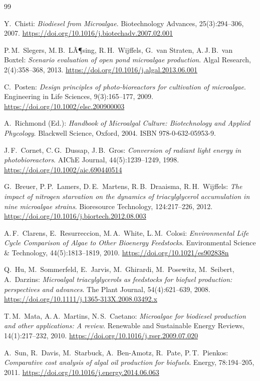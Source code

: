 ﻿\documentclass[a4paper,12pt]{article}
\theoremstyle{definition}
\begin{document}
\begin{thebibliography}{99}

Y.~Chisti:
\textit{Biodiesel from Microalgae}.
Biotechnology Advances, 25(3):294--306, 2007.
\url{https://doi.org/10.1016/j.biotechadv.2007.02.001}

P.\,M.~Slegers, M.\,B.~LÃ¶sing, R.\,H.~Wijffels, G.~van Straten, A.\,J.\,B.~van Boxtel:
\textit{Scenario evaluation of open pond microalgae production}.
Algal Research, 2(4):358--368, 2013.
\url{https://doi.org/10.1016/j.algal.2013.06.001}

C.~Posten:
\textit{Design principles of photo-bioreactors for cultivation of microalgae}.
Engineering in Life Sciences, 9(3):165--177, 2009.
\url{https://doi.org/10.1002/elsc.200900003}

A.~Richmond (Ed.):
\textit{Handbook of Microalgal Culture: Biotechnology and Applied Phycology}.
Blackwell Science, Oxford, 2004.
ISBN 978-0-632-05953-9.

J.\,F.~Cornet, C.\,G.~Dussap, J.\,B.~Gros:
\textit{Conversion of radiant light energy in photobioreactors}.
AIChE Journal, 44(5):1239--1249, 1998.
\url{https://doi.org/10.1002/aic.690440514}

G.~Breuer, P.\,P.~Lamers, D.\,E.~Martens, R.\,B.~Draaisma, R.\,H.~Wijffels:
\textit{The impact of nitrogen starvation on the dynamics of triacylglycerol
accumulation in nine microalgae strains}.
Bioresource Technology, 124:217--226, 2012.
\url{https://doi.org/10.1016/j.biortech.2012.08.003}

A.\,F.~Clarens, E.~Resurreccion, M.\,A.~White, L.\,M.~Colosi:
\textit{Environmental Life Cycle Comparison of Algae to Other Bioenergy Feedstocks}.
Environmental Science \& Technology, 44(5):1813--1819, 2010.
\url{https://doi.org/10.1021/es902838n}

Q.~Hu, M.~Sommerfeld, E.~Jarvis, M.~Ghirardi, M.~Posewitz, M.~Seibert, A.~Darzins:
\textit{Microalgal triacylglycerols as feedstocks for biofuel production:
perspectives and advances}.
The Plant Journal, 54(4):621--639, 2008.
\url{https://doi.org/10.1111/j.1365-313X.2008.03492.x}

T.\,M.~Mata, A.\,A.~Martins, N.\,S.~Caetano:
\textit{Microalgae for biodiesel production and other applications: A review}.
Renewable and Sustainable Energy Reviews, 14(1):217--232, 2010.
\url{https://doi.org/10.1016/j.rser.2009.07.020}

A.~Sun, R.~Davis, M.~Starbuck, A.~Ben-Amotz, R.~Pate, P.\,T.~Pienkos:
\textit{Comparative cost analysis of algal oil production for biofuels}.
Energy, 78:194--205, 2011.
\url{https://doi.org/10.1016/j.energy.2014.06.063}

\end{thebibliography}
\end{document}
